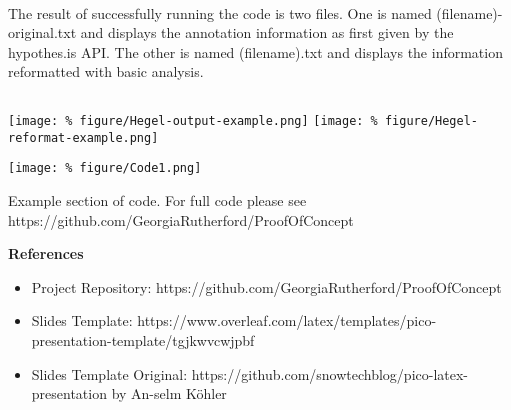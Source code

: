 \documentclass[unknownkeysallowed,usepdftitle=false, parskip=full]{beamer}
\newcommand{\secvariable}{nothing}
\newcommand{\mysection}[1]{\renewcommand{\secvariable}{#1}
}
\begin{document}
\begin{frame}\label{slabtable}
\begin{columns}
\begin{column}[t]{1.1\textwidth}
\hyperlink{slab}{}\\
The result of successfully running the code is two files. One is named (filename)-original.txt and displays the annotation information as first given by the hypothes.is API. The other is named (filename).txt and displays the information reformatted with basic analysis.



\vspace{0.3cm}
\end{column}
\end{columns}
%
\texttt{[image: \%
figure/Hegel-output-example.png]}\hspace{.05\textwidth}
\texttt{[image: \%
figure/Hegel-reformat-example.png]}
 
\vspace{0.2cm}

\end{frame}




\mysection{minor}
\begin{frame}\label{\secvariable} %
\begin{center}
\texttt{[image: \%
figure/Code1.png]}
\end{center}
\vspace{-0.2cm}

Example section of code. For full code please see https://github.com/GeorgiaRutherford/ProofOfConcept

\end{frame}

\mysection{conclusion}
\begin{frame}\label{\secvariable}
\textbf{References}
 \vspace{12pt}

  \begin{itemize}
   \item Project Repository: https://github.com/GeorgiaRutherford/ProofOfConcept 
  \item Slides Template: https://www.overleaf.com/latex/templates/pico-presentation-template/tgjkwvcwjpbf
  \item Slides Template Original: https://github.com/snowtechblog/pico-latex-presentation by An-selm Köhler

  \end{itemize}

  
\end{frame}
\end{document}
